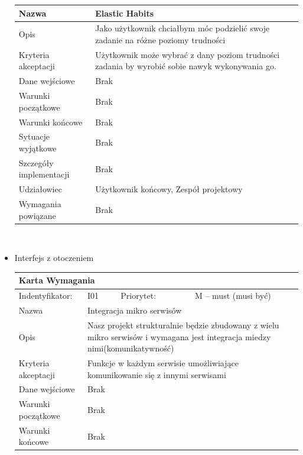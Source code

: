 \documentclass[a4paper,11pt]{report}
\begin{document}
\begin{itemize}
\begin{tabular}{|p{3cm}|p{2cm}|p{2cm}|p{6cm}|}
		\hline
		Nazwa & \multicolumn{3}{|p{10 cm}|}{Elastic Habits}\\
		\hline
		Opis & \multicolumn{3}{|p{10 cm}|}{Jako użytkownik chciałbym móc podzielić swoje zadanie na różne poziomy trudności }\\
		\hline
		Kryteria akceptacji & \multicolumn{3}{|p{10 cm}|}{Użytkownik może wybrać z dany poziom trudności zadania by wyrobić sobie nawyk wykonywania go.}\\
		\hline
		Dane wejściowe & \multicolumn{3}{|p{10 cm}|}{Brak}\\
		\hline
		Warunki początkowe & \multicolumn{3}{|p{10 cm}|}{Brak}\\
		\hline
		Warunki końcowe & \multicolumn{3}{|p{10 cm}|}{Brak}\\
		\hline
		Sytuacje wyjątkowe & \multicolumn{3}{|p{10 cm}|}{Brak}\\
		\hline
		Szczegóły implementacji & \multicolumn{3}{|p{10 cm}|}{Brak}\\
		\hline
		Udziałowiec & \multicolumn{3}{|p{10 cm}|}{Użytkownik końcowy, Zespół projektowy}\\
		\hline
		Wymagania powiązane & \multicolumn{3}{|p{10 cm}|}{Brak}\\
		\hline
		\end{tabular}\\
		\item Interfejs z otoczeniem\\
		\begin{tabular}{|p{3cm}|p{2cm}|p{2cm}|p{6cm}|}
		\hline
		\multicolumn{4}{|p{12 cm}|}{Karta Wymagania}\\
		\hline
		Indentyfikator: & I01 & Priorytet: & M – must (musi być)\\
		\hline
		Nazwa & \multicolumn{3}{|p{10 cm}|}{Integracja mikro serwisów}\\
		\hline
		Opis & \multicolumn{3}{|p{10 cm}|}{Nasz projekt strukturalnie będzie zbudowany z wielu mikro serwisów i wymagana jest integracja miedzy nimi(komunikatywność)}\\
		\hline
		Kryteria akceptacji & \multicolumn{3}{|p{10 cm}|}{Funkcje w każdym serwisie umożliwiające komunikowanie się z innymi serwisami}\\
		\hline
		Dane wejściowe & \multicolumn{3}{|p{10 cm}|}{Brak}\\
		\hline
		Warunki początkowe & \multicolumn{3}{|p{10 cm}|}{Brak}\\
		\hline
		Warunki końcowe & \multicolumn{3}{|p{10 cm}|}{Brak}\\
		\hline

\end{tabular}
\end{itemize}
\end{document}
